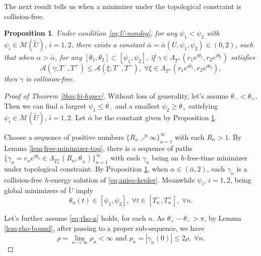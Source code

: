 \documentclass[11pt]{amsart}
\newcommand{\A}{\mathcal A}
\newcommand{\al}{\alpha}
\newcommand{\gm}{\gamma}
\newcommand{\tht}{\theta}
\newcommand{\Lmd}{\Lambda}
\theoremstyle{plain}
\newtheorem{prop}{Proposition}[section]
\theoremstyle{definition}
\theoremstyle{remark}
\begin{document}
 
The next result tells us when a minimizer under the topological constraint is collision-free. 
\begin{prop}
\label{prop;BTV}{\cite[Theorem 2]{BTV13}} Under condition \eqref{eq;U-nondeg}, for any $\psi_1 < \psi_2$ with $\psi_i  \in \mathcal{M}(\tilde{U})$, $i =1, 2$,  there exists a constant $\bar{\al} = \bar{\al}(U, \psi_1, \psi_2) \in (0, 2)$, such that when $\al >\bar{\al}$, for any $[\tht_1, \tht_2] \subset [\psi_1, \psi_2]$, if $\gm \in \Lmd_{T^{\pm}}(r_1e^{i\tht_1}, r_2 e^{i\tht_2})$ satisfies 
$$ \A(\gm; T^-, T^+) \le \A(\xi; T^-, T^+), \; \forall \xi \in \Lmd_{T^{\pm}}(r_1e^{i\tht_1}, r_2 e^{i\tht_2}),$$
then $\gm$ is collision-free. 
\end{prop}

\begin{proof}[Proof of Theorem \ref{thm;bi-hyper}]
Without loss of generality, let's assume $\tht_- < \tht_+$. Then we can find a largest $\psi_1 \le \tht_-$ and a smallest $\psi_2 \ge \tht_+$  satisfying $\psi_i \in \mathcal{M}(\tilde{U})$, $i =1, 2$. Let $\bar{\al}$ be the constant given by Proposition \ref{prop;BTV}. 


Choose a sequence of positive numbers $\{ R_n \nearrow \infty \}_{n =1}^{\infty}$ with each $R_n>1$. By Lemma \ref{lem;free-minimizer-top}, there is a sequence of paths $\{ \gm_n = r_n e^{i \tht_n} \in \Lmd_{T_n^{\pm}}(R_n, \tht_{\pm}) \}_{n =1}^{\infty}$ with each $\gm_n$ being an $h$-free-time minimizer under topological constraint. By Proposition \ref{prop;BTV}, when $\al \in (\bar{\al}, 2)$, each $\gm_n$ is a collision-free $h$-energy solution of \eqref{eq;aniso-kepler}. Meanwhile $\psi_i$, $i =1, 2$, being global minimizers of $\tilde{U}$ imply
\begin{equation}
\label{eq;psi1-pasi2} \tht_n(t) \in [\psi_1, \psi_2], \; \forall t \in [T_n^-, T_n^+], \; \forall n. 
\end{equation}

Let's further assume \eqref{eq;rho-n} holds, for each $n$. As $\tht_+ -\tht_- >\pi$, by Lemma \ref{lem;rho-bound}, after passing to a proper sub-sequence, we have  
\begin{equation}
	\label{eq;rho-n-bound} \rho = \lim_{n \to \infty} \rho_n < \infty \text{ and } \rho_n = |\gm_n(0)| \le 2\rho, \; \forall n.
\end{equation}


\end{proof}
\end{document}
